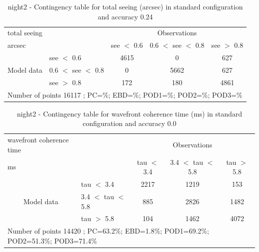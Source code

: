 \begin{table}[p!]
\begin{center}
\begin{tabular}{llccc}
\hline
{total seeing}                                       &                                                    & \multicolumn{3}{c}{Observations}                 \\
{arcsec}                                       &                             & see $<$ 0.6   & 0.6 $<$ see $<$ 0.8 & see $>$ 0.8 \\
\hline
\multicolumn{1}{c}{\multirow{3}{*}{Model data}}  & see $<$ 0.6             & 4615                & 0                       & 627              \\
                                                 & 0.6  $<$ see $<$ 0.8 & 0                & 5662                       & 627              \\
                                                 & see $>$ 0.8             & 172                & 180                       & 4861              \\
\hline
\multicolumn{5}{l}{ Number of points        16117 ; PC=\%; EBD=\%; POD1=\%; POD2=\%; POD3=\%}
\end{tabular}
\end{center}
\caption{night2 - Contingency table for  total seeing (arcsec) in standard configuration and accuracy 0.24}
\label{tab:contingencyseeBEF:night2}
\end{table}
\clearpage
\begin{table}[p!]
\begin{center}
\begin{tabular}{llccc}
\hline
{wavefront coherence time}                                       &                                                    & \multicolumn{3}{c}{Observations}                 \\
{ms}                                       &                             & tau $<$ 3.4   & 3.4 $<$ tau $<$ 5.8 & tau $>$ 5.8 \\
\hline
\multicolumn{1}{c}{\multirow{3}{*}{Model data}}  & tau $<$ 3.4             & 2217                & 1219                       & 153              \\
                                                 & 3.4  $<$ tau $<$ 5.8 & 885                & 2826                       & 1482              \\
                                                 & tau $>$ 5.8             & 104                & 1462                       & 4072              \\
\hline
\multicolumn{5}{l}{ Number of points        14420 ; PC=63.2\%; EBD=1.8\%; POD1=69.2\%; POD2=51.3\%; POD3=71.4\%}
\end{tabular}
\end{center}
\caption{night2 - Contingency table for  wavefront coherence time (ms) in standard configuration and accuracy 0.0}
\label{tab:contingencytauBEF:night2}
\end{table}
